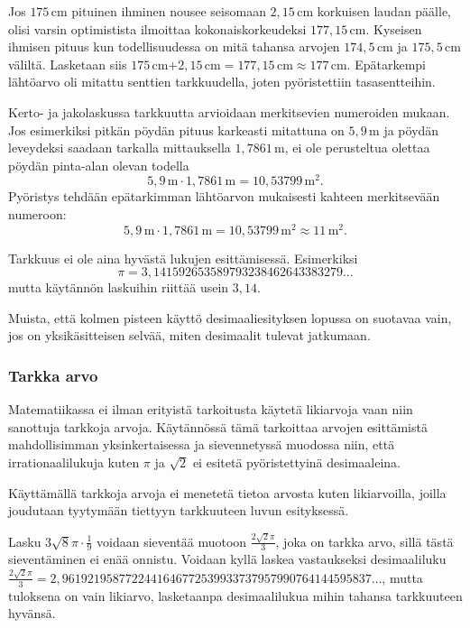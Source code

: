 \begin{esimerkki} Jos $175$\,cm pituinen ihminen nousee seisomaan $2,15$\,cm korkuisen laudan päälle, olisi varsin optimistista ilmoittaa kokonaiskorkeudeksi $177,15$\,cm. Kyseisen ihmisen pituus kun todellisuudessa on mitä tahansa arvojen $174,5$\,cm ja $175,5$\,cm väliltä. Lasketaan siis $175$\,cm$+2,15$\,cm$=177,15$\,cm$\approx 177$\,cm. 
Epätarkempi lähtöarvo oli mitattu senttien tarkkuudella, joten pyöristettiin tasasentteihin.
\end{esimerkki}

Kerto- ja jakolaskussa tarkkuutta arvioidaan merkitsevien numeroiden mukaan. Jos esimerkiksi pitkän pöydän pituus karkeasti mitattuna on $5,9$\,m ja pöydän leveydeksi saadaan tarkalla mittauksella $1,7861$\,m, ei ole perusteltua olettaa pöydän pinta-alan olevan todella
\[ 5,9\,\textrm{m} \cdot 1,7861\,\textrm{m} = 10,53799\,\textrm{m}^2. \] 
Pyöristys tehdään epätarkimman lähtöarvon mukaisesti kahteen merkitsevään numeroon:
\[ 5,9\,\textrm{m} \cdot 1,7861\,\textrm{m} = 10,53799\,\textrm{m}^2 \approx 11\,\textrm{m}^2.\] 

Tarkkuus ei ole aina hyvästä lukujen esittämisessä. Esimerkiksi
\[ \pi = 3,141592653589793238462643383279 \ldots \]
mutta käytännön laskuihin riittää usein $3,14$.

Muista, että kolmen pisteen käyttö desimaaliesityksen lopussa on suotavaa vain, jos on yksikäsitteisen selvää, miten desimaalit tulevat jatkumaan.

\subsubsection*{Tarkka arvo}

Matematiikassa ei ilman erityistä tarkoitusta käytetä likiarvoja vaan niin sanottuja tarkkoja arvoja. Käytännössä tämä tarkoittaa arvojen esittämistä mahdollisimman yksinkertaisessa ja sievennetyssä muodossa niin, että irrationaalilukuja kuten $\pi$ ja $\sqrt{2}$ ei esitetä pyöristettyinä desimaaleina. %

Käyttämällä tarkkoja arvoja ei menetetä tietoa arvosta kuten likiarvoilla, joilla joudutaan tyytymään tiettyyn tarkkuuteen luvun esityksessä.

\begin{esimerkki}
Lasku $3\sqrt{8}\pi \cdot \frac{1}{9}$ voidaan sieventää muotoon $\frac{2\sqrt{2}\pi}{3}$, joka on tarkka arvo, sillä tästä sieventäminen ei enää onnistu. Voidaan kyllä laskea vastaukseksi desimaaliluku $\frac{2\sqrt{2}\pi}{3}=2,9619219587722441646772539933737957990764144595837\ldots$, mutta tuloksena on vain likiarvo, lasketaanpa desimaalilukua mihin tahansa tarkkuuteen hyvänsä.
\end{esimerkki}


